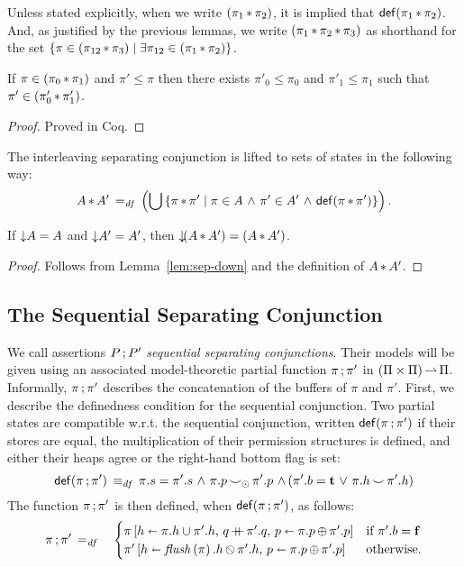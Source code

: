 \documentclass[11pt]{report}
\begin{document}
Unless stated explicitly, when we write $(\pi_1 \operatorname{\ast} \pi_2)$, it is implied that $\mathsf{def}(\pi_1 \operatorname{\ast} \pi_2)$. And, as justified by the previous lemmas, we write $(\pi_1 \operatorname{\ast} \pi_2 \operatorname{\ast} \pi_3)$ as shorthand for the set $\left\lbrace \pi \in (\pi_{12} \operatorname{\ast} \pi_3) \mid \exists \pi_{12} \in (\pi_1 \operatorname{\ast} \pi_2) \right\rbrace$. 

\begin{lemma}
	\label{lem:sep-down}
	If $\pi \in (\pi_0 \operatorname{\ast} \pi_1)$ and $\pi' \leq \pi$ then there exists $\pi'_0 \leq \pi_0$ and $\pi'_1 \leq \pi_1$ such that $\pi' \in (\pi'_0 \operatorname{\ast} \pi'_1)$. 
\end{lemma}

\begin{proof}
	Proved in Coq. 
\end{proof}

The interleaving separating conjunction is lifted to sets of states in the following way: \[ A \operatorname{\ast} A' \operatorname{\;=_{\mathit{df}}\;} \left(\bigcup \left\lbrace \pi \operatorname{\ast} \pi' \mid \pi \in A \operatorname{\,\wedge\,} \pi' \in A' \operatorname{\,\wedge\,} \mathsf{def}(\pi \operatorname{\ast} \pi') \right\rbrace\right).\] 

\begin{lemma}
	\label{lem:sep-closure}
	If $\operatorname{\downarrow}\!A = A$ and $\operatorname{\downarrow}\!A' = A'$, then $\operatorname{\downarrow}\!(A \operatorname{\ast} A') = (A \operatorname{\ast} A')$. 
\end{lemma}

\begin{proof}
	Follows from Lemma~\ref{lem:sep-down} and the definition of $A \operatorname{\ast} A'$. 
\end{proof}

\subsection{The Sequential Separating Conjunction}

We call assertions $P \operatorname{;} P'$ \emph{sequential separating conjunctions}. Their models will be given using an associated model-theoretic partial function $\pi \operatorname{;} \pi'$ in $(\Pi \times \Pi) \operatorname{\rightharpoonup} \Pi$. Informally, $\pi \operatorname{;} \pi'$ describes the concatenation of the buffers of $\pi$ and $\pi'$. First, we describe the definedness condition for the sequential conjunction. Two partial states are compatible w.r.t. the sequential conjunction, written $\mathsf{def}(\pi \operatorname{;} \pi')$ if their stores are equal, the multiplication of their permission structures is defined, and either their heaps agree or the right-hand bottom flag is set: \[ \mathsf{def}(\pi \operatorname{;} \pi') \operatorname{\;\equiv_{\mathit{df}}\;} \pi.s = \pi'.s \operatorname{\,\wedge\,} \pi.p \operatorname{\smile}_{\operatorname{\odot}} \pi'.p \operatorname{\,\wedge\,} (\pi'.b = \mathbf{t} \operatorname{\,\vee\,} \pi.h \operatorname{\smile} \pi'.h)\]
The function $\pi \operatorname{;} \pi'$ is then defined, when $\mathsf{def}(\pi \operatorname{;} \pi')$, as follows: \begin{eqnarray*}
	\pi \seq \pi' & \eqdef & \begin{cases}
		\funup{\pi}{\ptup{h}{\pi.h \cup \pi'.h},\,\ptapp{q}{\pi'.q},\,\ptup{p}{\pi.p \shadd \pi'.p}} & \text{if $\pi'.b = \bvf$} \\
		\funup{\pi'}{\ptup{h}{\sflush{\pi}.h \override \pi'.h},\, \ptup{p}{\pi.p \shadd \pi'.p}}  & \text{otherwise.}
	\end{cases}
\end{eqnarray*}
\end{document}

